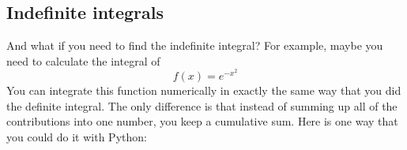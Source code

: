 %
%
%
%
%
%
%
%
%
%
%

\subsection*{Indefinite integrals}

And what if you need to find the indefinite integral? For example,
maybe you need to calculate the integral of 
\begin{equation}
f(x) = e^{-x^2}
\end{equation}
You can integrate this function numerically in exactly the same way
that you did the definite integral.   The only difference is that
instead of summing up all of the contributions into one number, you
keep a cumulative sum.  Here is one way that you could do it with Python:

